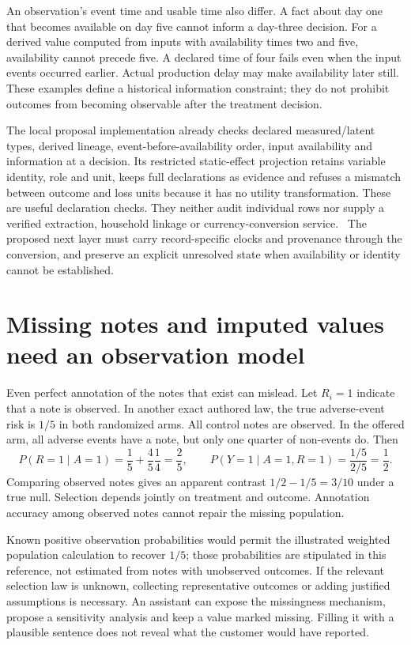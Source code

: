 An observation's event time and usable time also differ. A fact about day
one that becomes available on day five cannot inform a day-three decision.
For a derived value computed from inputs with availability times two and
five, availability cannot precede five. A declared time of four fails even
when the input events occurred earlier. Actual production delay may make
availability later still. These examples define a historical information
constraint; they do not prohibit outcomes from becoming observable after
the treatment decision.~\citep{exec17_ontology_oracle}

The local proposal implementation already checks declared measured/latent
types, derived lineage, event-before-availability order, input availability
and information at a decision. Its restricted static-effect projection
retains variable identity, role and unit, keeps full declarations as evidence
and refuses a mismatch between outcome and loss units because it has no
utility transformation. These are useful declaration checks. They neither
audit individual rows nor supply a verified extraction, household linkage or
currency-conversion service.~\citep{exec17_ontology_sources}
The proposed next layer must carry record-specific clocks and provenance
through the conversion, and preserve an explicit unresolved state when
availability or identity cannot be established.

\section{Missing notes and imputed values need an observation model}

Even perfect annotation of the notes that exist can mislead. Let
\(R_i=1\) indicate that a note is observed. In another exact authored law, the
true adverse-event risk is \(1/5\) in both randomized arms. All control notes
are observed. In the offered arm, all adverse events have a note, but only
one quarter of non-events do. Then
\[
 P(R=1\mid A=1)=\frac15+\frac45\frac14=\frac25,
 \qquad
 P(Y=1\mid A=1,R=1)=\frac{1/5}{2/5}=\frac12.
\]
Comparing observed notes gives an apparent contrast \(1/2-1/5=3/10\)
under a true null. Selection depends jointly on treatment and outcome.
Annotation accuracy among observed notes cannot repair the missing
population.~\citep{exec17_ontology_oracle}

Known positive observation probabilities would permit the illustrated
weighted population calculation to recover \(1/5\); those probabilities are
stipulated in this reference, not estimated from notes with unobserved
outcomes. If the relevant selection law is unknown, collecting representative
outcomes or adding justified assumptions is necessary. An assistant can expose
the missingness mechanism, propose a sensitivity analysis and keep a value
marked missing. Filling it with a plausible sentence does not reveal what
the customer would have reported.

